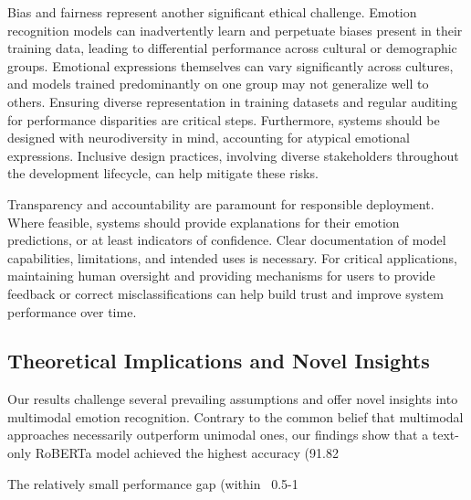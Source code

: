\documentclass[12pt]{article}
\begin{document}
Bias and fairness represent another significant ethical challenge. Emotion recognition models can inadvertently learn and perpetuate biases present in their training data, leading to differential performance across cultural or demographic groups. Emotional expressions themselves can vary significantly across cultures, and models trained predominantly on one group may not generalize well to others. Ensuring diverse representation in training datasets and regular auditing for performance disparities are critical steps. Furthermore, systems should be designed with neurodiversity in mind, accounting for atypical emotional expressions. Inclusive design practices, involving diverse stakeholders throughout the development lifecycle, can help mitigate these risks.

Transparency and accountability are paramount for responsible deployment. Where feasible, systems should provide explanations for their emotion predictions, or at least indicators of confidence. Clear documentation of model capabilities, limitations, and intended uses is necessary. For critical applications, maintaining human oversight and providing mechanisms for users to provide feedback or correct misclassifications can help build trust and improve system performance over time.

\subsection{Theoretical Implications and Novel Insights}
Our results challenge several prevailing assumptions and offer novel insights into multimodal emotion recognition. Contrary to the common belief that multimodal approaches necessarily outperform unimodal ones, our findings show that a text-only RoBERTa model achieved the highest accuracy (91.82%

The relatively small performance gap (within ~0.5-1%
\end{document}
